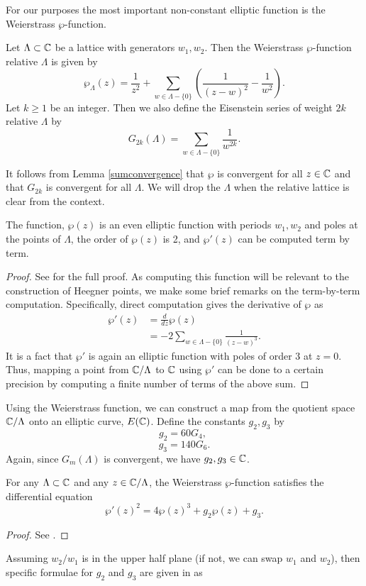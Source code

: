 For our purposes the most important non-constant elliptic function is the Weierstrass $\wp$-function. 
\begin{definition}
Let $\Lambda \subset \mathbb{C}$ be a lattice with generators $w_1,w_2$. Then the Weierstrass $\wp$-function relative $\Lambda$ is given by 
$$\wp_{\Lambda}(z) = \frac{1}{z^2} + \sum_{w \in \Lambda-\{ 0\}} \left(\frac{1}{(z - w)^2} - \frac{1}{w^2}\right).$$
Let $k \geq 1$ be an integer. Then we also define the Eisenstein series of weight $2k$ relative $\Lambda$ by
$$G_{2k}(\Lambda) = \sum_{w \in \Lambda-\{ 0\}} \frac{1}{w^{2k}}.$$
\end{definition}
It follows from Lemma \ref{sumconvergence} that $\wp$ is convergent for all $z \in \mathbb{C}$ and that $G_{2k}$ is convergent for all $\Lambda$. We will drop the $\Lambda$ when the relative lattice is clear from the context.

\begin{prop} 
The function, $\wp(z)$ is an even elliptic function with periods $w_1,w_2$ and poles at the points of $\Lambda$, the order of $\wp(z)$ is 2, and $\wp'(z)$ can be computed term by term.
\end{prop}
\begin{proof}
See \cite[Section VI.3]{Knapp} for the full proof. As computing this function will be relevant to the construction of Heegner points, we make some brief remarks on the term-by-term computation. Specifically, direct computation gives the derivative of $\wp$ as
\begin{align*}
\wp'(z) &= \frac{d}{dz} \wp(z) \\
&= -2 \sum_{w \in \Lambda - \{0\}}\frac{1}{(z - w)^3}.
\end{align*}
It is a fact that $\wp'$ is again an elliptic function with poles of order 3 at $z = 0$. Thus, mapping a point from $\mathbb{C}/\Lambda$ to $\mathbb{C}$ using $\wp'$ can be done to a certain precision by computing a finite number of terms of the above sum.
\end{proof}

Using the Weierstrass function, we can construct a map from the quotient space $\mathbb{C}/\Lambda$ onto an elliptic curve, $E(\mathbb{C})$. Define the constants $g_2, g_3$ by 
$$g_2  = 60G_4,\;$$
$$g_3 = 140G_6.$$
Again, since $G_m(\Lambda)$ is convergent, we have $g_2,g_3 \in \mathbb{C}$.  

\begin{prop}
For any $\Lambda \subset \mathbb{C}$ and any $z \in \mathbb{C}/\Lambda$, the Weierstrass $\wp$-function satisfies the differential equation
$$\wp'(z)^2 = 4\wp(z)^3 + g_2\wp(z) + g_3.$$
\end{prop}
\begin{proof}
See \cite[Page 436]{MR0178117}.
\end{proof}
Assuming $w_2/w_1$ is in the upper half plane (if not, we can swap $w_1$ and $w_2$), then specific formulae for $g_2$ and $g_3$ are given in \cite[Proposition 7.4.1]{Cohen} as

